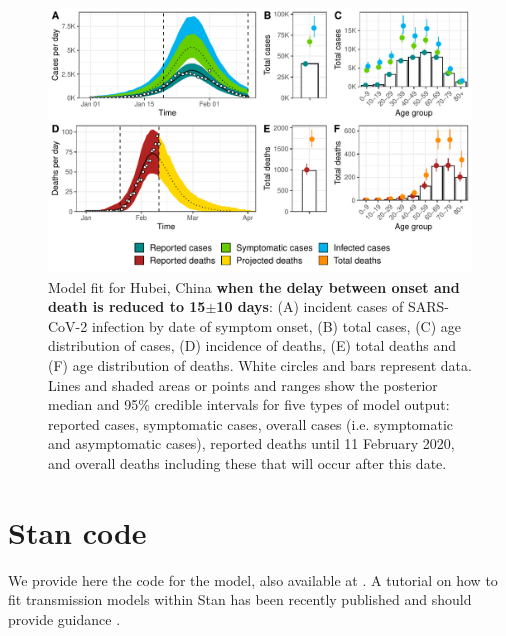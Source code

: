 \documentclass{article}
\begin{document}
\begin{figure}[H]
	\includegraphics[width=\linewidth]{../format_output/figures_v3/supp_fit_16I.pdf}
	\caption{Model fit for Hubei, China \textbf{when the delay between onset and death is reduced to 15$\pm$10 days}: (A) incident cases of SARS-CoV-2 infection by date of symptom onset, (B) total cases, (C) age distribution of cases, (D) incidence of deaths, (E) total deaths and (F) age distribution of deaths. White circles and bars represent data. Lines and shaded areas or points and ranges show the posterior median and 95\% credible intervals for five types of model output: reported cases, symptomatic cases, overall cases (i.e. symptomatic and asymptomatic cases), reported deaths until 11 February 2020, and overall deaths including these that will occur after this date.}\label{fig:fit_sst2}
\end{figure}



\clearpage

\section{Stan code}

We provide here the code for the model, also available at \underline{}. A tutorial on how to fit transmission models within Stan has been recently published and should provide guidance \cite{tutorial}.
\end{document}
